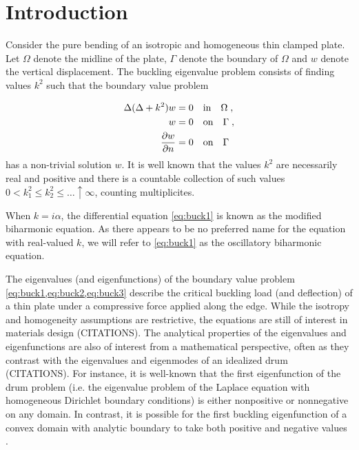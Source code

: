 \section{Introduction}


Consider the pure bending of an isotropic and homogeneous thin clamped
plate. 
Let $\Omega$ denote the midline of the plate, $\Gamma$ denote the 
boundary of $\Omega$ and $w$ denote the vertical displacement.
The buckling eigenvalue problem consists of finding 
values $k^{2}$ such that the boundary value problem

\begin{align}
\Delta (\Delta + k^2) w &= 0 \quad \textrm{in} \quad \Omega \label{eq:buck1} \; , \\
w &= 0 \quad \textrm{on} \quad \Gamma \label{eq:buck2} \; ,\\
\frac{\partial w}{\partial n} &=0 \quad \textrm{on} \quad \Gamma \label{eq:buck3} 
\end{align}
has a non-trivial solution $w$. 
It is well known that the values $k^2$ are necessarily real 
and positive and there is a countable collection
of such values 
$0 < k_{1}^{2} \leq k_{2}^2 \leq \ldots \uparrow \infty$,
counting multiplicites.

\begin{remark}
  When $k = i\alpha$, the differential equation
  \cref{eq:buck1} is known as the modified biharmonic
  equation. As there appears to be no preferred
  name for the equation with real-valued $k$,
  we will refer to \cref{eq:buck1} as the
  oscillatory biharmonic equation.
\end{remark}

The eigenvalues (and eigenfunctions)
of the boundary value problem \cref{eq:buck1,eq:buck2,eq:buck3}
describe the critical buckling load (and deflection)
of a thin plate under
a compressive force applied along the edge. While the
isotropy and homogeneity assumptions are restrictive,
the equations are still of interest in materials design
(CITATIONS). The analytical properties of the eigenvalues and
eigenfunctions are also of interest from a mathematical
perspective, often as they contrast with the eigenvalues
and eigenmodes of an idealized drum (CITATIONS). For instance,
it is well-known that the first eigenfunction of the
drum problem (i.e. the eigenvalue problem of the Laplace
equation with homogeneous Dirichlet boundary conditions)
is either nonpositive or nonnegative on any domain.
In contrast, it is possible for the first buckling
eigenfunction of a convex domain with analytic boundary
to take both positive and negative values \cite{antunes2011buckling}.

